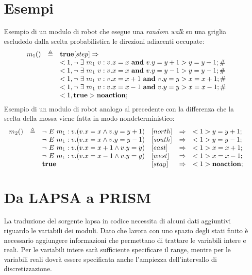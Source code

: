 \section{Esempi}
Esempio di un modulo di robot che esegue una \emph{random walk} su una griglia escludedo dalla scelta probabilistica le direzioni adiacenti occupate:
$$
\begin{array}{rcl}
m_1 () & \triangleq & \mathbf{true} [step]\Rightarrow \\ 
	& & <1, \neg \mbox{ } \exists \mbox{ } m_1 \mbox{ } v: v.x=x \mbox{ } \mathbf{and} \mbox{ } v.y=y+1> y=y+1; \# \\
	& & <1, \neg \mbox{ } \exists \mbox{ } m_1 \mbox{ } v: v.x=x \mbox{ } \mathbf{and} \mbox{ } v.y=y-1> y=y-1; \# \\ 
	& & <1, \neg \mbox{ } \exists \mbox{ } m_1 \mbox{ } v: v.x=x+1 \mbox{ } \mathbf{and} \mbox{ } v.y=y> x=x+1; \# \\ 
	& & <1, \neg \mbox{ } \exists \mbox{ } m_1 \mbox{ } v: v.x=x-1 \mbox{ } \mathbf{and} \mbox{ } v.y=y> x=x-1; \# \\ 
	& & <1, \mathbf{true}> \mathbf{noaction};\\ 
\end{array}
$$
Esempio di un modulo di robot analogo al precedente con la differenza che la scelta della mossa viene fatta in modo nondeterministico:
$$
\begin{array}{rcllcl}
m_2 () & \triangleq & \neg \mbox{ } E \mbox{ } m_1 : v . (v.x=x \wedge v.y=y+1) &[north]&\Rightarrow& <1> y=y+1; \\ 
	& & \neg \mbox{ } E \mbox{ } m_1 : v . (v.x=x \wedge v.y=y-1) &[south]&\Rightarrow& <1> y=y-1; \\ 
	& & \neg \mbox{ } E \mbox{ } m_1 : v . (v.x=x+1 \wedge v.y=y) &[east]&\Rightarrow& <1> x=x+1; \\ 
	& & \neg \mbox{ } E \mbox{ } m_1 : v . (v.x=x-1 \wedge v.y=y) &[west]&\Rightarrow& <1> x=x-1; \\ 
	& & \mathbf{true} &[stay]&\Rightarrow& <1> \mathbf{noaction}; \\ 
\end{array}
$$

\section{Da LAPSA a PRISM}
La traduzione del sorgente \ac{lapsa} in codice \prism{} necessita di alcuni dati aggiuntivi riguardo le variabili dei moduli. Dato che \prism{} lavora con uno spazio degli stati finito è necessario aggiungere informazioni che permettano di trattare le variabili intere e reali. Per le variabili intere sarà sufficiente specificare il range, mentre per le variabili reali dovrà essere specificata anche l'ampiezza dell'intervallo di discretizzazione.

